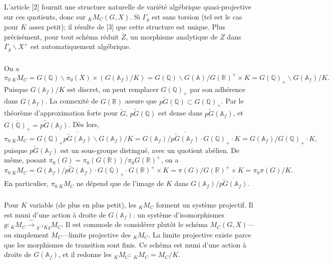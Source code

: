 \documentclass[12pt,a4paper]{article}
\theoremstyle{plain}
\theoremstyle{definition}
\theoremstyle{remark}
\newcommand{\QQ}{\mathbb{Q}}
\newcommand{\RR}{\mathbb{R}}
\newcommand{\Af}{\mathbb{A}_f}
\newcommand{\A}{\mathbb{A}}
\begin{document}
L'article [2] fournit une structure naturelle de vari\'et\'e alg\'ebrique quasi-projective sur ces quotients, donc sur ${}_K M_C(G,X)$. Si $\Gamma_g$ est sans torsion (tel est le cas pour $K$ assez petit); il r\'esulte de [3] que cette structure est unique. Plus pr\'ecis\'ement, pour tout sch\'ema r\'eduit $Z$, un morphisme analytique de $Z$ dans $\Gamma_g\backslash X^+$ est automatiquement alg\'ebrique.

\subsubsection{}

On a
\[
\pi_0\, {}_K M_C = G(\QQ)\backslash \pi_0(X) \times (G(\Af)/K) = G(\QQ)\backslash G(\A)/G(\RR)^+ \times K = G(\QQ)_+\backslash G(\Af)/K.
\]
Puisque $G(\Af)/K$ est discret, on peut remplacer $G(\QQ)_+$ par son adh\'erence dans $G(\Af)$. La connexit\'e de $G(\RR)$ assure que $p\tilde{G}(\QQ) \subset G(\QQ)_+$. Par le th\'eor\`eme d'approximation forte pour $\tilde{G}$, $p\tilde{G}(\QQ)$ est dense dans $p\tilde{G}(\Af)$, et $\overline{G(\QQ)_+} = \overline{p\tilde{G}(\Af)}$. D\`es lors,
\begin{equation}\label{eq:2.1.3.1}
\pi_0\, {}_K M_C = G(\QQ)_+\overline{p\tilde{G}(\Af)}\backslash G(\Af)/K = G(\Af)/\overline{p\tilde{G}(\Af)} \cdot G(\QQ)_+ \cdot K = G(\Af)/G(\QQ)_+ \cdot K,
\end{equation}
puisque $p\tilde{G}(\Af)$ est un sous-groupe distingu\'e, avec un quotient ab\'elien. De m\^eme, posant $\pi_0(G) = \pi_0(G(\RR))/\pi_0 G(\RR)^+$, on a
\begin{equation}\label{eq:2.1.3.2}
\pi_0\, {}_K M_C = G(\Af)/p\tilde{G}(\Af) \cdot G(\QQ)_+ \cdot G(\RR)^+ \times K = \pi(G)/G(\RR)^+ \times K = \pi_0\pi(G)/K.
\end{equation}
En particulier, $\pi_0\, {}_K M_C$ ne d\'epend que de l'image de $K$ dans $G(\Af)/\overline{p\tilde{G}(\Af)}$.

\subsubsection{}

Pour $K$ variable (de plus en plus petit), les ${}_K M_C$ forment un syst\`eme projectif. Il est muni d'une action \`a droite de $G(\Af)$: un syst\`eme d'isomorphismes $g:{}_K M_C \xrightarrow{\;\sim\;} {}_{g^{-1}Kg} M_C$. Il est commode de consid\'erer plut\^ot le sch\'ema $M_C(G,X)$---ou simplement $M_C$---limite projective des ${}_K M_C$. La limite projective existe parce que les morphismes de transition sont finis. Ce sch\'ema est muni d'une action \`a droite de $G(\Af)$, et il redonne les ${}_K M_C$: ${}_K M_C = M_C/K$.
\end{document}
